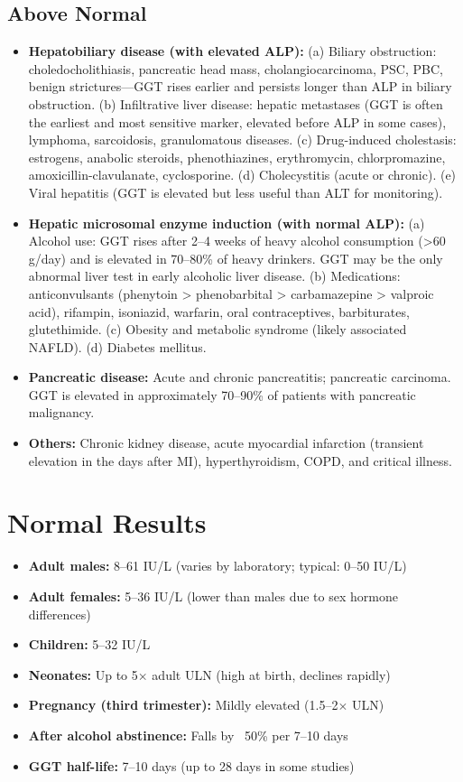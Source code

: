\subsection*{Above Normal}
\begin{itemize}
  \item \textbf{Hepatobiliary disease (with elevated ALP):} (a) Biliary obstruction: choledocholithiasis, pancreatic head mass, cholangiocarcinoma, PSC, PBC, benign strictures---GGT rises earlier and persists longer than ALP in biliary obstruction. (b) Infiltrative liver disease: hepatic metastases (GGT is often the earliest and most sensitive marker, elevated before ALP in some cases), lymphoma, sarcoidosis, granulomatous diseases. (c) Drug-induced cholestasis: estrogens, anabolic steroids, phenothiazines, erythromycin, chlorpromazine, amoxicillin-clavulanate, cyclosporine. (d) Cholecystitis (acute or chronic). (e) Viral hepatitis (GGT is elevated but less useful than ALT for monitoring).
  \item \textbf{Hepatic microsomal enzyme induction (with normal ALP):} (a) Alcohol use: GGT rises after 2--4 weeks of heavy alcohol consumption (>60 g/day) and is elevated in 70--80\% of heavy drinkers. GGT may be the only abnormal liver test in early alcoholic liver disease. (b) Medications: anticonvulsants (phenytoin > phenobarbital > carbamazepine > valproic acid), rifampin, isoniazid, warfarin, oral contraceptives, barbiturates, glutethimide. (c) Obesity and metabolic syndrome (likely associated NAFLD). (d) Diabetes mellitus.
  \item \textbf{Pancreatic disease:} Acute and chronic pancreatitis; pancreatic carcinoma. GGT is elevated in approximately 70--90\% of patients with pancreatic malignancy.
  \item \textbf{Others:} Chronic kidney disease, acute myocardial infarction (transient elevation in the days after MI), hyperthyroidism, COPD, and critical illness.
\end{itemize}

\section*{Normal Results}
\begin{itemize}
  \item \textbf{Adult males:} 8--61 IU/L (varies by laboratory; typical: 0--50 IU/L)
  \item \textbf{Adult females:} 5--36 IU/L (lower than males due to sex hormone differences)
  \item \textbf{Children:} 5--32 IU/L
  \item \textbf{Neonates:} Up to 5$\times$ adult ULN (high at birth, declines rapidly)
  \item \textbf{Pregnancy (third trimester):} Mildly elevated (1.5--2$\times$ ULN)
  \item \textbf{After alcohol abstinence:} Falls by ~50\% per 7--10 days
  \item \textbf{GGT half-life:} 7--10 days (up to 28 days in some studies)
\end{itemize}

